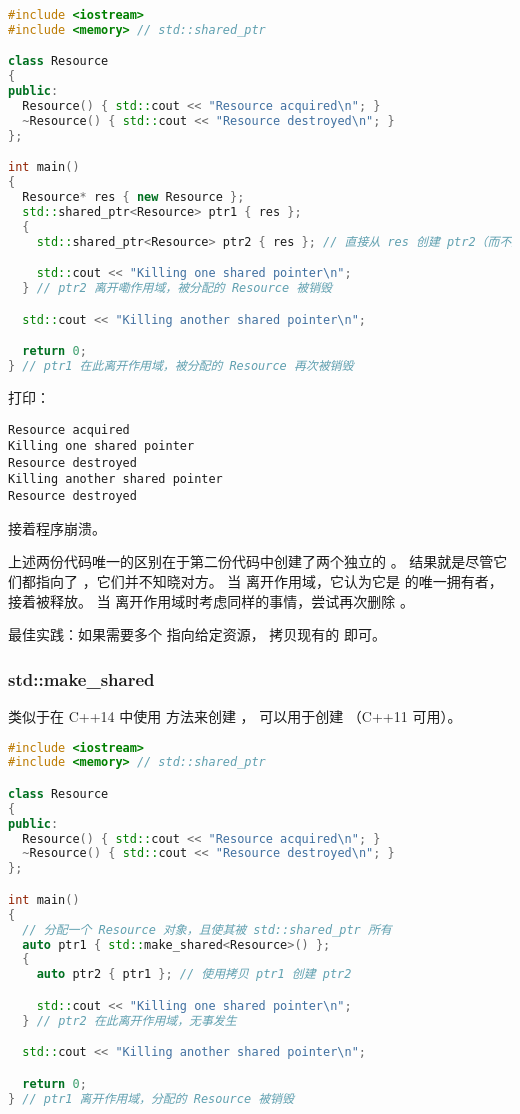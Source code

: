 \documentclass[../../LearnCpp.tex]{subfiles}
\begin{document}
\begin{lstlisting}[language=C++]
#include <iostream>
#include <memory> // std::shared_ptr

class Resource
{
public:
  Resource() { std::cout << "Resource acquired\n"; }
  ~Resource() { std::cout << "Resource destroyed\n"; }
};

int main()
{
  Resource* res { new Resource };
  std::shared_ptr<Resource> ptr1 { res };
  {
    std::shared_ptr<Resource> ptr2 { res }; // 直接从 res 创建 ptr2（而不是从 ptr1）

    std::cout << "Killing one shared pointer\n";
  } // ptr2 离开嘞作用域，被分配的 Resource 被销毁

  std::cout << "Killing another shared pointer\n";

  return 0;
} // ptr1 在此离开作用域，被分配的 Resource 再次被销毁
\end{lstlisting}

打印：

\begin{lstlisting}
Resource acquired
Killing one shared pointer
Resource destroyed
Killing another shared pointer
Resource destroyed
\end{lstlisting}

接着程序崩溃。

上述两份代码唯一的区别在于第二份代码中创建了两个独立的 。
结果就是尽管它们都指向了 ，它们并不知晓对方。
当  离开作用域，它认为它是  的唯一拥有者，接着被释放。
当  离开作用域时考虑同样的事情，尝试再次删除 。

最佳实践：如果需要多个  指向给定资源，
拷贝现有的  即可。

\subsubsection*{std::make\_shared}

类似于在 C++14 中使用  方法来创建 ，
 可以用于创建 （C++11 可用）。

\begin{lstlisting}[language=C++]
#include <iostream>
#include <memory> // std::shared_ptr

class Resource
{
public:
  Resource() { std::cout << "Resource acquired\n"; }
  ~Resource() { std::cout << "Resource destroyed\n"; }
};

int main()
{
  // 分配一个 Resource 对象，且使其被 std::shared_ptr 所有
  auto ptr1 { std::make_shared<Resource>() };
  {
    auto ptr2 { ptr1 }; // 使用拷贝 ptr1 创建 ptr2

    std::cout << "Killing one shared pointer\n";
  } // ptr2 在此离开作用域，无事发生

  std::cout << "Killing another shared pointer\n";

  return 0;
} // ptr1 离开作用域，分配的 Resource 被销毁
\end{lstlisting}
\end{document}

